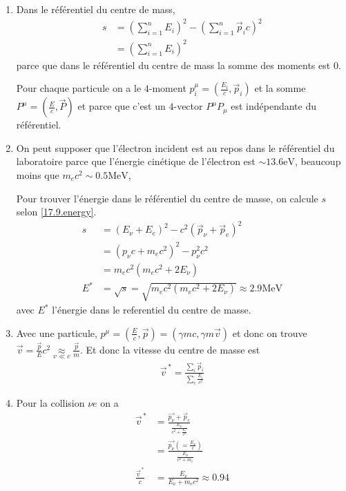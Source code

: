 \documentclass[10pt]{report}
\begin{document}
\begin{enumerate}[1.]
    \item Dans le r\'ef\'erentiel du centre de mass,
        \begin{align}
            s &= \left( \sum\limits_{i=1}^{n}E_i \right)^2 - \left( \sum\limits_{i=1}^{n}\vec{p}_i c \right)^2\label{17.9.energy}\\
            &= \left(\sum\limits_{i=1}^{n}E_i\right)^2
        \end{align}
        parce que dans le r\'ef\'erentiel du centre de mass la somme des moments est $0$.
        
        Pour chaque particule on a le $4$-moment $p_i^\mu = \left( \frac{E_i}{c}, \vec{p}_i \right)$ et la somme $P^\mu = \left( \frac{E}{c}, \vec{P} \right)$ et parce que c'est un $4$-vector $P^\mu P_\mu$ est ind\'ependante du r\'ef\'erentiel.
    \item On peut supposer que l'\'electron incident est au repos dans le r\'ef\'erentiel du laboratoire parce que l'\'energie cin\'etique de l'\'electron est $\sim 13.6 \mathrm{eV}$, beaucoup moins que $m_ec^2 \sim 0.5\mathrm{MeV}$,

        Pour trouver l'\'energie dans le r\'ef\'erentiel du centre de masse, on calcule $s$ selon \eqref{17.9.energy}. 
        \begin{align}
            s &= \left( E_\nu + E_e \right)^2 - c^2 \left( \vec{p}_\nu + \vec{p}_e \right)^2\\
            &= \left( p_\nu c + m_ec^2 \right)^2 - p_\nu^2c^2\\
            &= m_ec^2\left( m_ec^2 + 2E_{\nu} \right)\\
            E^* &= \sqrt{s} = \sqrt{m_ec^2\left( m_ec^2 + 2E_\nu \right)} \approx 2.9\mathrm{MeV}
        \end{align}
        avec $E^*$ l'\'energie dans le referentiel du centre de masse.
    \item Avec une particule, $p^\mu = \left( \frac{E}{c}, \vec{p} \right) = \left( \gamma mc, \gamma m\vec{v} \right)$ et donc on trouve $\vec{v} = \frac{\vec{p}}{E}c^2 \underset{v \ll c}{\approx} \frac{\vec{p}}{m}$. Et donc la vitesse du centre de masse est
        \begin{align}
            \vec{v}^{\, *} = \frac{\sum\limits_{i}^{}\vec{p}_i}{\sum\limits_{i}^{}\frac{E_i}{c^2}}
        \end{align}
    \item Pour la collision $\nu e$ on a
        \begin{align}
            \vec{v}^{\, *} &= \frac{\vec{p_\nu} + \vec{p}_e}{\frac{E_\nu}{c^2 + \frac{E_e}{c^2}}}\\
            &= \frac{\vec{p_\nu} \left(=\!\!\frac{E_\nu}{c}\right)}{\frac{E_\nu}{c^2 + m_e}}\\
            \frac{\vec{v}^{\,*}}{c} &= \frac{E_\nu}{E_\nu + m_ec^2} \approx 0.94
        \end{align}


\end{enumerate}
\end{document}
